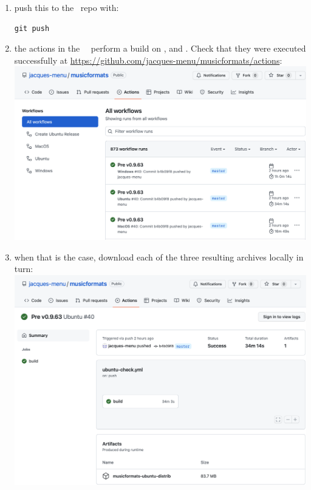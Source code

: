\begin{enumerate}
\item push this to the \mf\ repo with:
\begin{lstlisting}[language=Terminal]
git push
\end{lstlisting}


\item the actions in the \mf\ \repo\ perform a build on \Linux, \Windows and \MacOS. Check that they were executed successfully at \url{https://github.com/jacques-menu/musicformats/actions}:\\
\includegraphics[scale=0.5]{../graphics/SuccessfulActions.png}


\item when that is the case, download each of the three resulting  archives locally in turn:\\
\includegraphics[scale=0.5]{../graphics/DownloadDistribution.png}


\end{enumerate}
